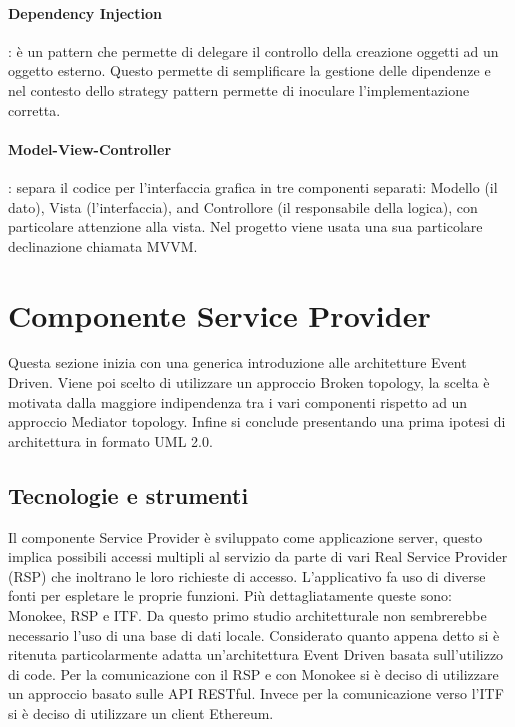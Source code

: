 \paragraph{Dependency Injection}: è un pattern che permette di delegare il controllo della creazione oggetti ad un oggetto esterno. Questo permette di semplificare la gestione delle dipendenze e nel contesto dello strategy pattern permette di inoculare l’implementazione corretta.

\paragraph{Model-View-Controller}: separa il codice per l’interfaccia grafica in tre componenti separati: Modello (il dato), Vista (l’interfaccia), and Controllore (il responsabile della logica), con particolare attenzione alla vista. Nel progetto viene usata una sua particolare declinazione chiamata MVVM. 



\newpage
\section{Componente Service Provider}
Questa sezione inizia con una generica introduzione alle architetture Event Driven. Viene poi scelto di utilizzare un approccio Broken topology, la scelta è motivata dalla maggiore indipendenza tra i vari componenti rispetto ad un approccio Mediator topology. Infine si conclude presentando una prima ipotesi di architettura in formato UML 2.0.



\subsection{Tecnologie e strumenti}
\label{sec:tecnologie-strumenti}
Il componente Service Provider è sviluppato come applicazione server, questo implica possibili accessi multipli al servizio da parte di vari Real Service Provider (RSP) che inoltrano le loro richieste di accesso. L’applicativo fa uso di diverse fonti per espletare le proprie funzioni. Più dettagliatamente queste sono: Monokee, RSP e ITF. Da questo primo studio architetturale non sembrerebbe necessario l’uso di una base di dati locale.  Considerato quanto appena detto si è ritenuta particolarmente adatta un’architettura Event Driven basata sull’utilizzo di code. Per la comunicazione con il RSP e con Monokee si è deciso di utilizzare un approccio basato sulle API RESTful. Invece per la comunicazione verso l’ITF si è deciso di utilizzare un client Ethereum.

